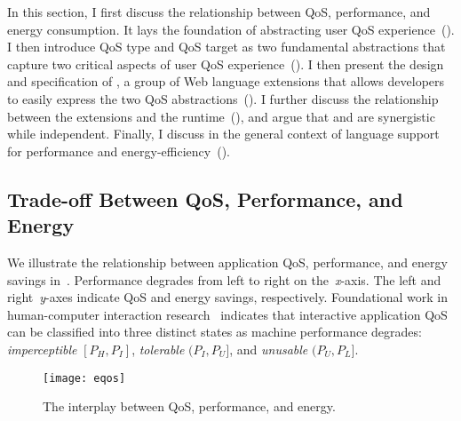 In this section, I first discuss the relationship between QoS, performance, and energy consumption. It lays the foundation of abstracting user QoS experience~(). I then introduce QoS type and QoS target as two fundamental abstractions that capture two critical aspects of user QoS experience~(). I then present the design and specification of \greenweb, a group of Web language extensions that allows developers to easily express the two QoS abstractions~(). I further discuss the relationship between the \greenweb extensions and the \webrt runtime~(), and argue that \greenweb and \webrt are synergistic while independent. Finally, I discuss \greenweb in the general context of language support for performance and energy-efficiency~().

\subsection{Trade-off Between QoS, Performance, and Energy}
\label{sec:lang:eqos}

We illustrate the relationship between application QoS, performance, and energy savings in~. Performance degrades from left to right on the~\textit{x}-axis. The left and right~\textit{y}-axes indicate QoS and energy savings, respectively. Foundational work in human-computer interaction research~\cite{eventlatency, designUI, info_vis, response_time, percent_done, usability_engineering} indicates that interactive application QoS can be classified into three distinct states as machine performance degrades: \textit{imperceptible} $[P_H,P_I]$, \textit{tolerable} $(P_I,P_U]$, and \textit{unusable} $(P_U,P_L]$.

\begin{figure}[h]
\centering
\captionsetup{width=.7\columnwidth}
\texttt{[image: eqos]}
\caption{\small{The interplay between QoS, performance, and energy.}}
\label{fig:eqos}
\end{figure}


